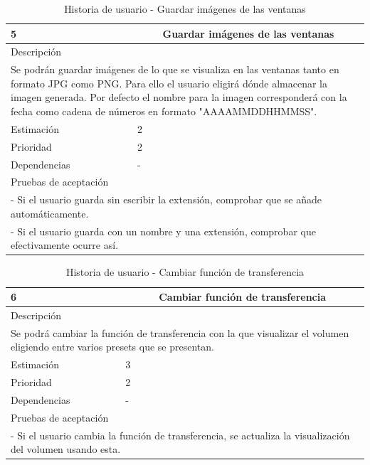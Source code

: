 \begin{table}[H]
	\begin{center}
		\begin{tabular} {|l|c|l|}
			\hline
			5 & \multicolumn{2}{c|}{Guardar imágenes de las ventanas} \\ \hline \hline
			\multicolumn{3}{|l|}{Descripción} \\ \hline
			\multicolumn{3}{|p{12cm}|}{Se podrán guardar imágenes de lo que se visualiza en las ventanas tanto en formato JPG como PNG. Para ello el usuario eligirá dónde almacenar la imagen generada. Por defecto el nombre para la imagen corresponderá con la fecha como cadena de números en formato "AAAAMMDDHHMMSS".} \\ \hline
			\multicolumn{2}{|l|}{Estimación} & 2 \\ \hline
			\multicolumn{2}{|l|}{Prioridad} & 2 \\ \hline
			\multicolumn{2}{|l|}{Dependencias} & - \\ \hline
			\multicolumn{3}{|l|}{Pruebas de aceptación} \\ \hline
			\multicolumn{3}{|p{12cm}|}{ - Si el usuario guarda sin escribir la extensión, comprobar que se añade automáticamente.} \\
			\multicolumn{3}{|p{12cm}|}{ - Si el usuario guarda con un nombre y una extensión, comprobar que efectivamente ocurre así.} \\ \hline
		\end{tabular}
	\end{center}
	\caption{Historia de usuario - Guardar imágenes de las ventanas}
	\label{tab:hu_guardar_imagenes_de_las_ventanas}
\end{table}

\begin{table}[H]
	\begin{center}
		\begin{tabular} {|l|c|l|}
			\hline
			6 & \multicolumn{2}{c|}{Cambiar función de transferencia} \\ \hline \hline
			\multicolumn{3}{|l|}{Descripción} \\ \hline
			\multicolumn{3}{|p{12cm}|}{Se podrá cambiar la función de transferencia con la que visualizar el volumen eligiendo entre varios presets que se presentan.} \\ \hline
			\multicolumn{2}{|l|}{Estimación} & 3 \\ \hline
			\multicolumn{2}{|l|}{Prioridad} & 2 \\ \hline
			\multicolumn{2}{|l|}{Dependencias} & - \\ \hline
			\multicolumn{3}{|l|}{Pruebas de aceptación} \\ \hline
			\multicolumn{3}{|p{12cm}|}{ - Si el usuario cambia la función de transferencia, se actualiza la visualización del volumen usando esta.} \\ \hline
		\end{tabular}
	\end{center}
	\caption{Historia de usuario - Cambiar función de transferencia}
	\label{tab:hu_cambiar_funcion_de_transferencia}
\end{table}

